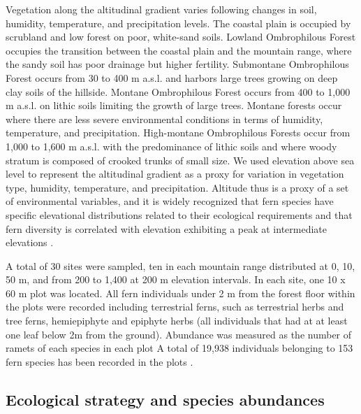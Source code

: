 \documentclass[12pt]{article}
\begin{document}
Vegetation along the altitudinal gradient varies following changes in
soil, humidity, temperature, and precipitation levels.  The coastal
plain is occupied by scrubland and low forest on poor, white-sand
soils.  Lowland Ombrophilous Forest occupies the transition between
the coastal plain and the mountain range, where the sandy soil has
poor drainage but higher fertility.  Submontane Ombrophilous Forest
occurs from 30 to 400 m a.s.l. and harbors large trees growing on deep
clay soils of the hillside. Montane Ombrophilous Forest occurs from
400 to 1,000 m a.s.l. on lithic soils limiting the growth of large
trees. Montane forests occur where there are less severe environmental
conditions in terms of humidity, temperature, and
precipitation. High-montane Ombrophilous Forests occur from 1,000 to
1,600 m a.s.l. with the predominance of lithic soils and where woody
stratum is composed of crooked trunks of small size.  We used
elevation above sea level to represent the altitudinal gradient as a
proxy for variation in vegetation type, humidity, temperature, and
precipitation.
Altitude thus is a proxy of a set of environmental variables, and %
it is
widely %
recognized that fern species have specific elevational distributions
related to their ecological requirements \citep{Mehltreter2010} and
that %
fern diversity is correlated with elevation exhibiting a peak at
intermediate elevations
\citep{Kessler2001,Cardelus2006,WatkinsJr2006, Paciencia2008}.

A total of 30 sites were sampled, %
ten %
in each mountain range %
distributed at 0, 10, 50 m, and from 200 to 1,400 at 200 m elevation
intervals. In each site, one 10 x 60 m plot was
located.
All fern individuals under 2 m from the forest floor
within the plots were recorded %
including terrestrial ferns, such as terrestrial herbs and tree ferns,
hemiepiphyte and epiphyte herbs (all individuals that had at at least one leaf below 2m from the ground).
Abundance was measured
as the number of ramets of each species in each plot %
A total of 19,938 individuals belonging to 153 fern species has been recorded in the plots \cite{Paciencia2008}.

\subsection*{Ecological strategy and species abundances}
\end{document}
